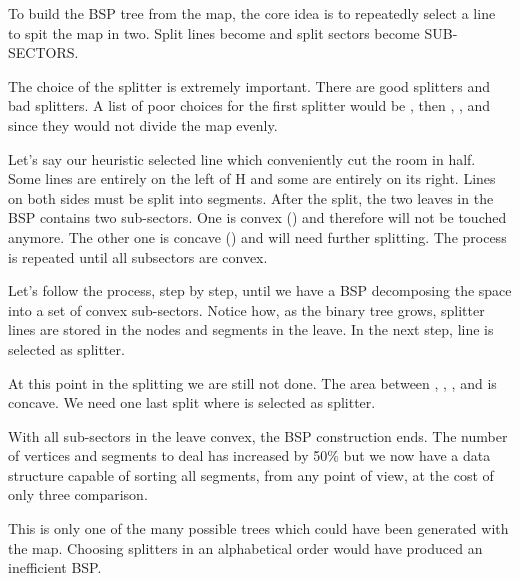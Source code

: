 \par
{}
\par
To build the BSP tree from the map, the core idea is to repeatedly select a line to spit the map in two. Split lines become  and split sectors become {SUB-SECTORS}.\\ 
\par
The choice of the splitter is extremely important. There are good splitters and bad splitters. A list of poor choices for the first splitter would be , then , , and  since they would not divide the map evenly.\\ 
\par
Let's say our heuristic selected line  which conveniently cut  the room in half. Some lines are entirely on the left of H and some are entirely on its right. Lines on both sides must be split into segments.  After the split, the two leaves in the BSP contains two sub-sectors. One is convex () and therefore will not be touched anymore. The other one is concave () and will need further splitting. The process is repeated until all subsectors are convex.\\
\par
{}
\par
Let's follow the process, step by step, until we have a BSP decomposing the space into a set of convex sub-sectors. Notice how, as the binary tree grows, splitter lines are stored in the nodes and segments in the leave. In the next step, line  is selected as splitter.
\par
{}
\par
At this point in the splitting we are still not done. The area between , , , and  is concave. We need one last split where  is selected as splitter.\\ 
\par
{}
\par
With all sub-sectors in the leave convex, the BSP construction ends. The number of vertices and segments to deal has increased by 50\% but we now have a data structure capable of sorting all segments, from any point of view, at the cost of only three comparison.\\
\par
This is only one of the many possible trees which could have been generated with the map. Choosing splitters in an alphabetical order would have produced an inefficient BSP.\\




